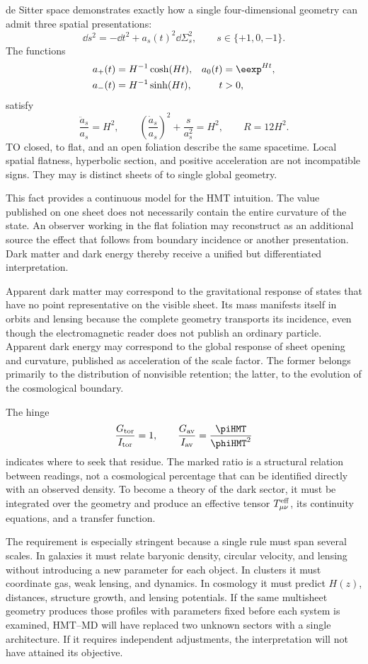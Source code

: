 de Sitter space demonstrates exactly how a single four-dimensional geometry
can admit three spatial presentations:
\[
 \dd s^2
 =
 -\dd t^2+a_s(t)^2\dd\Sigma_s^2,
 \qquad s\in\{+1,0,-1\}.
\]
The functions
\[
 \begin{aligned}
 a_+(t)&=H^{-1}\cosh(Ht),
 &
 a_0(t)&=\eexp^{Ht},\\
 a_-(t)&=H^{-1}\sinh(Ht),
 &
 t&>0,
 \end{aligned}
\]
satisfy
\[
 \frac{\ddot a_s}{a_s}=H^2,
\qquad
 \left(\frac{\dot a_s}{a_s}\right)^2
 +
 \frac{s}{a_s^2}
 =
 H^2,
\qquad
 R=12H^2.
\]
TO closed, to flat, and an open foliation describe the same spacetime.
Local spatial flatness, hyperbolic section, and positive acceleration are not incompatible signs. They may is distinct sheets of to single global geometry.

This fact provides a continuous model for the HMT intuition. The value published
on one sheet does not necessarily contain the entire curvature of the state. An observer
working in the flat foliation may reconstruct as an additional source the effect
that follows from boundary incidence or another presentation. Dark matter and
dark energy thereby receive a unified but differentiated interpretation.

Apparent dark matter may correspond to the gravitational response of states that have no point representative on the visible sheet. Its mass manifests itself in orbits and lensing because the complete geometry transports its incidence, even though the electromagnetic reader does not publish an ordinary particle. Apparent dark energy may correspond to the global response of sheet opening and curvature, published as acceleration of the scale factor. The former belongs primarily to the distribution of nonvisible retention; the latter, to the evolution of the cosmological boundary.

The hinge
\[
 \frac{G_{\rm tor}}{I_{\rm tor}}=1,
 \qquad
 \frac{G_{\rm av}}{I_{\rm av}}
 =
 \frac{\piHMT}{\phiHMT^2}
\]
indicates where to seek that residue. The marked ratio is a structural relation between readings, not a cosmological percentage that can be identified directly with an observed density. To become a theory of the dark sector, it must be integrated over the geometry and produce an effective tensor \(T^{\rm eff}_{\mu\nu}\), its continuity equations, and a transfer function.

The requirement is especially stringent because a single rule must span several scales. In galaxies it must relate baryonic density, circular velocity, and lensing without introducing a new parameter for each object. In clusters it must coordinate gas, weak lensing, and dynamics. In cosmology it must predict \(H(z)\), distances, structure growth, and lensing potentials. If the same multisheet geometry produces those profiles with parameters fixed before each system is examined, HMT--MD will have replaced two unknown sectors with a single architecture. If it requires independent adjustments, the interpretation will not have attained its objective.


